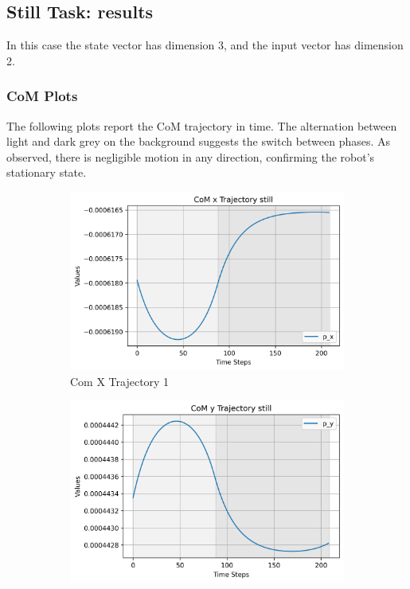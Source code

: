 \documentclass[main.tex]{subfiles}
\begin{document}
\subsection{Still Task: results}
In this case the state vector has dimension 3, and the input vector has dimension 2.
\subsubsection*{CoM Plots}
The following plots report the CoM trajectory in time. 
The alternation between light and dark grey on the background suggests the switch between phases.
As observed, there is negligible motion in any direction, confirming the robot's stationary state.

\begin{figure}[H]
    \centering
    \begin{subfigure}[b]{0.45\textwidth}
        \centering
        \includegraphics[width=\textwidth]{figures/CoM x Trajectory still.png}
        \caption{Com X Trajectory 1}
        \label{fig:sub1_still}
    \end{subfigure}
    \hfill
    \begin{subfigure}[b]{0.45\textwidth}
        \centering
        \includegraphics[width=\textwidth]{figures/CoM y Trajectory still.png}

\end{subfigure}
\end{figure}
\end{document}
